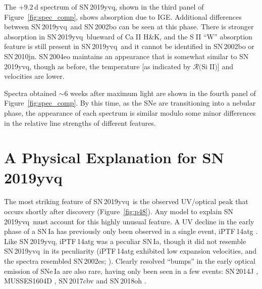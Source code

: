 \documentclass[twocolumn]{aastex63}
\def\ion#1#2{#1$\;${\footnotesize\rm{#2}}\relax}
\newcommand{\RSiII}{$\mathcal{R}($\ion{Si}{II}$)$}
\newcommand{\sn}{SN\,2019yvq}
\begin{document}
The $+9.2$\,d spectrum of \sn, shown in the third panel of
Figure~\ref{fig:spec_comp}, shows absorption due to IGE. Additional
differences between \sn\ and SN\,2002bo can be seen at this phase. There is
stronger absorption in \sn\ blueward of \ion{Ca}{II} H\&K, and the \ion{S}{II}
``W'' absorption feature is still present in \sn\ and it cannot be identified
in SN\,2002bo or SN\,2010jn. SN\,2004eo maintains an appearance that is
somewhat similar to \sn, though as before, the temperature [as indicated by
\RSiII] and velocities are lower.

Spectra obtained $\sim$6 weeks after maximum light are shown in the fourth
panel of Figure~\ref{fig:spec_comp}. By this time, as the SNe are
transitioning into a nebular phase, the appearance of each spectrum is similar
modulo some minor differences in the relative line strengths of different
features.

\section{A Physical Explanation for \sn}\label{sec:models}

The most striking feature of \sn\ is the observed UV/optical peak that occurs
shortly after discovery (Figure~\ref{fig:p48}). Any model to explain \sn\ must
account for this highly unusual feature. A UV decline in the early phase of a
SN\,Ia has previously only been observed in a single event, iPTF\,14atg
\citep{Cao15}. Like \sn, iPTF\,14atg was a peculiar SN\,Ia, though it did not
resemble \sn\ in its peculiarity (iPTF\,14atg exhibited low expansion
velocities, and the spectra resembled SN\,2002es;
\citealt{Ganeshalingam12,Cao15}). Clearly resolved ``bumps'' in the early
optical emission of SNe\,Ia are also rare, having only been seen in a few
events: SN\,2014J \citep{Goobar15}, MUSSES1604D \citep{Jiang17}, SN\,2017cbv
\citep{Hosseinzadeh17} and SN\,2018oh \citep{Shappee19,Dimitriadis19}.
\end{document}
